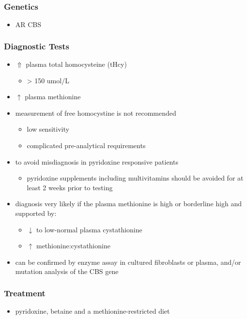 \documentclass[12pt]{scrartcl}
\begin{document}
\begin{center}
\begin{center}
\subsubsection{Genetics}
\label{sec:org5664cc2}
\begin{itemize}
\item AR CBS
\end{itemize}

\subsubsection{Diagnostic Tests}
\label{sec:orgcbd8984}
\begin{itemize}
\item \(\Uparrow\) plasma total homocysteine (tHcy)
\begin{itemize}
\item \textgreater{} 150 umol/L
\end{itemize}
\item \(\uparrow\) plasma methionine
\item measurement of free homocystine is not recommended
\begin{itemize}
\item low sensitivity
\item complicated pre-analytical requirements
\end{itemize}
\item to avoid misdiagnosis in pyridoxine responsive patients
\begin{itemize}
\item pyridoxine supplements including multivitamins should be avoided
for at least 2 weeks prior to testing
\end{itemize}
\item diagnosis very likely if the plasma methionine is high or borderline
high and supported by:
\begin{itemize}
\item \(\downarrow\) to low-normal plasma cystathionine
\item \(\uparrow\) methionine:cystathionine
\end{itemize}
\item can be confirmed by enzyme assay in cultured fibroblasts or plasma,
and/or mutation analysis of the CBS gene
\end{itemize}

\subsubsection{Treatment}
\label{sec:orgfb28cd7}
\begin{itemize}
\item pyridoxine, betaine and a methionine-restricted diet
\end{itemize}


\end{center}
\end{center}
\end{document}
